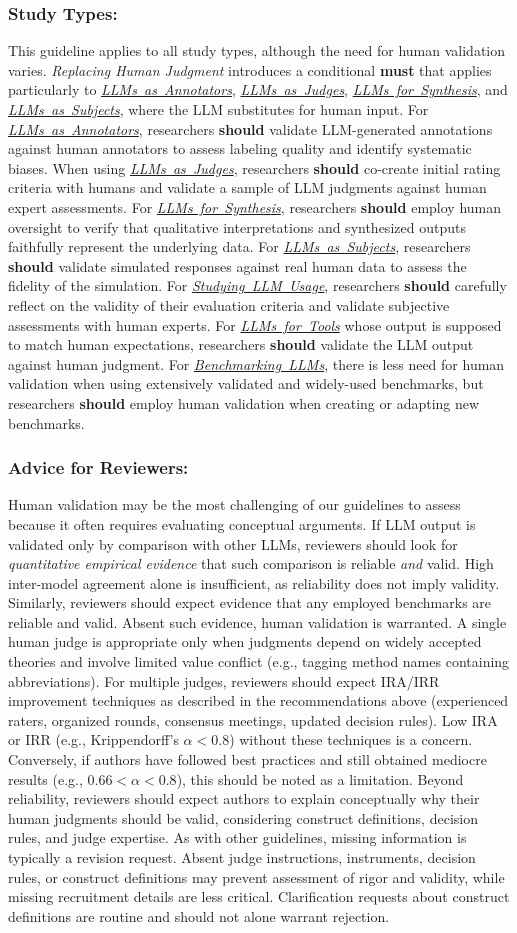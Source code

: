 \documentclass[smallextended]{svjour3}
\newcommand{\must}{\textbf{must}\xspace}
\newcommand{\should}{\textbf{should}\xspace}
\newcommand{\annotators}{\hyperref[sec:llms-as-annotators]{\mbox{\emph{LLMs as Annotators}}}\xspace}
\newcommand{\judges}{\hyperref[sec:llms-as-judges]{\mbox{\emph{LLMs as Judges}}}\xspace}
\newcommand{\synthesis}{\hyperref[sec:llms-for-synthesis]{\mbox{\emph{LLMs for Synthesis}}}\xspace}
\newcommand{\subjects}{\hyperref[sec:llms-as-subjects]{\mbox{\emph{LLMs as Subjects}}}\xspace}
\newcommand{\llmusage}{\hyperref[sec:studying-llm-usage-in-software-engineering]{\mbox{\emph{Studying LLM Usage}}}\xspace}
\newcommand{\newtools}{\hyperref[sec:llms-for-new-software-engineering-tools]{\mbox{\emph{LLMs for Tools}}}\xspace}
\newcommand{\benchmarkingtasks}{\hyperref[sec:benchmarking-llms-for-software-engineering-tasks]{\mbox{\emph{Benchmarking LLMs}}}\xspace}
\newcommand{\annotators}{\href{/study-types/annotators/}{\emph{LLMs as Annotators}}\xspace}
\newcommand{\judges}{\href{/study-types/judges/}{\emph{LLMs as Judges}}\xspace}
\newcommand{\synthesis}{\href{/study-types/synthesis/}{\emph{LLMs for Synthesis}}\xspace}
\newcommand{\subjects}{\href{/study-types/subjects/}{\emph{LLMs as Subjects}}\xspace}
\newcommand{\llmusage}{\href{/study-types/usage/}{\emph{Studying LLM Usage}}\xspace}
\newcommand{\newtools}{\href{/study-types/tools/}{\emph{LLMs for Tools}}\xspace}
\newcommand{\benchmarkingtasks}{\href{/study-types/benchmarking/}{\emph{Benchmarking LLMs}}\xspace}
\newcommand{\guidelinesubsubsection}[1]{\subsubsection{\bfseries #1:}}
\newcommand{\guidelinesubsubsection}[1]{\subsubsection{#1}}
\begin{document}
\guidelinesubsubsection{Study Types}

This guideline applies to all study types, although the need for human validation varies. \emph{Replacing Human Judgment} introduces a conditional \must that applies particularly to \annotators, \judges, \synthesis, and \subjects, where the LLM substitutes for human input.
For \annotators, researchers \should validate LLM-generated annotations against human annotators to assess labeling quality and identify systematic biases.
When using \judges, researchers \should co-create initial rating criteria with humans and validate a sample of LLM judgments against human expert assessments.
For \synthesis, researchers \should employ human oversight to verify that qualitative interpretations and synthesized outputs faithfully represent the underlying data.
For \subjects, researchers \should validate simulated responses against real human data to assess the fidelity of the simulation.
For \llmusage, researchers \should carefully reflect on the validity of their evaluation criteria and validate subjective assessments with human experts.
For \newtools whose output is supposed to match human expectations, researchers \should validate the LLM output against human judgment.
For \benchmarkingtasks, there is less need for human validation when using extensively validated and widely-used benchmarks, but researchers \should employ human validation when creating or adapting new benchmarks.

\guidelinesubsubsection{Advice for Reviewers}

Human validation may be the most challenging of our guidelines to assess because it often requires evaluating conceptual arguments. If LLM output is validated only by comparison with other LLMs, reviewers should look for \textit{quantitative empirical evidence} that such comparison is reliable \textit{and} valid. High inter-model agreement alone is insufficient, as reliability does not imply validity. Similarly, reviewers should expect evidence that any employed benchmarks are reliable and valid. Absent such evidence, human validation is warranted.
A single human judge is appropriate only when judgments depend on widely accepted theories and involve limited value conflict (e.g., tagging method names containing abbreviations). For multiple judges, reviewers should expect IRA/IRR improvement techniques as described in the recommendations above (experienced raters, organized rounds, consensus meetings, updated decision rules). Low IRA or IRR (e.g., Krippendorff's $\alpha<0.8$) without these techniques is a concern. Conversely, if authors have followed best practices and still obtained mediocre results (e.g., $0.66<\alpha<0.8$), this should be noted as a limitation.
Beyond reliability, reviewers should expect authors to explain conceptually why their human judgments should be valid, considering construct definitions, decision rules, and judge expertise.
As with other guidelines, missing information is typically a revision request. Absent judge instructions, instruments, decision rules, or construct definitions may prevent assessment of rigor and validity, while missing recruitment details are less critical. Clarification requests about construct definitions are routine and should not alone warrant rejection.
\end{document}
